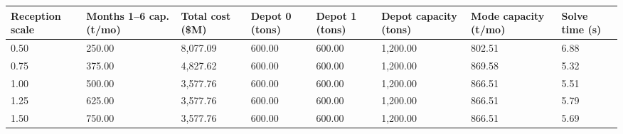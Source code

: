 \begin{tabular}{llllllll}
\toprule
Reception scale & Months 1--6 cap. (t/mo) & Total cost (\$M) & Depot 0 (tons) & Depot 1 (tons) & Depot capacity (tons) & Mode capacity (t/mo) & Solve time (s) \\
\midrule
0.50 & 250.00 & 8,077.09 & 600.00 & 600.00 & 1,200.00 & 802.51 & 6.88 \\
0.75 & 375.00 & 4,827.62 & 600.00 & 600.00 & 1,200.00 & 869.58 & 5.32 \\
1.00 & 500.00 & 3,577.76 & 600.00 & 600.00 & 1,200.00 & 866.51 & 5.51 \\
1.25 & 625.00 & 3,577.76 & 600.00 & 600.00 & 1,200.00 & 866.51 & 5.79 \\
1.50 & 750.00 & 3,577.76 & 600.00 & 600.00 & 1,200.00 & 866.51 & 5.69 \\
\bottomrule
\end{tabular}
